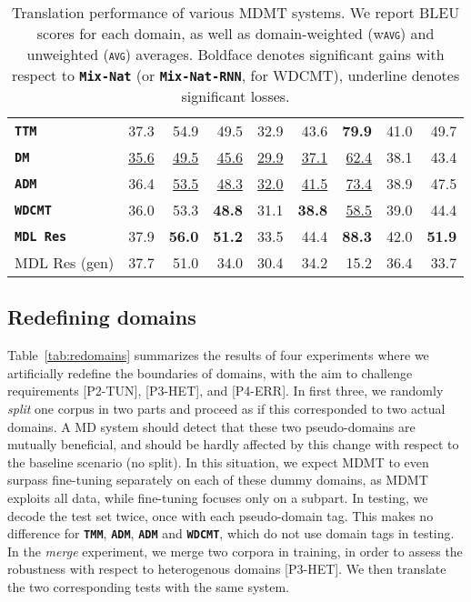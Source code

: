 \documentclass[11pt,a4paper]{article}
\newcommand{\fyTodo}[1]{\Todo[FY:]{\textcolor{orange}{#1}}}
\newcommand{\fyDone}[1]{\done[FY]\Todo[FY:]{\textcolor{orange}{#1}}}
\newcommand{\domain}[1]{\texttt{\textsc{#1}}}
\newcommand{\system}[1]{\texttt{\textbf{#1}}}
\newcommand{\SB}[1]{\textbf{#1}}
\newcommand{\SW}[1]{\underline{#1}}
\begin{document}
\begin{table*}
\begin{tabular}{|p{3cm}|*{8}{r|}}
    \system{TTM}            & 37.3 & 54.9 & 49.5 & 32.9 & 43.6 & \SB{79.9} &41.0 & 49.7     \\%
    \system{DM}             & \SW{35.6} & \SW{49.5}  & \SW{45.6}& \SW{29.9} & \SW{37.1} & \SW{62.4} & 38.1 & 43.4 \\ %
    \system{ADM}           & 36.4 & \SW{53.5}  & \SW{48.3} & \SW{32.0} & \SW{41.5} & \SW{73.4} & 38.9 & 47.5 \\%
    \system{WDCMT}       & 36.0 & 53.3 & \SB{48.8} & 31.1 & \SB{38.8} & \SW{58.5} & 39.0 & 44.4 \\ %
    \system{MDL Res}     & 37.9 & \SB{56.0}  & \SB{51.2}   & 33.5   &  44.4  & \SB{88.3} & 42.0 & \SB{51.9} \\%
    \hfill MDL Res (gen)    & 37.7 & 51.0 & 34.0 & 30.4 & 34.2 & 15.2 & 36.4 & 33.7\\
     \hline
  \end{tabular}
  \caption{Translation performance of various MDMT systems. We report BLEU scores for each domain, as well as domain-weighted (w\domain{avg}) and unweighted (\domain{avg}) averages. Boldface denotes significant gains with respect to \system{Mix-Nat} (or \system{Mix-Nat-RNN}, for WDCMT), underline denotes significant losses.}
  \label{tab:performance}
  \fyTodo{Do we have significancy tests for averages?} %
\end{table*}

\subsection{Redefining domains \label{ssec:redomains}}

Table~\ref{tab:redomains} summarizes the results of four experiments where we artificially redefine the boundaries of domains, with the aim to challenge requirements [P2-TUN], [P3-HET], and [P4-ERR]. In first three, we randomly \emph{split} one corpus in two parts and proceed as if this corresponded to two actual domains. A MD system should detect that these two pseudo-domains are mutually beneficial, and should be hardly affected by this change with respect to the baseline scenario (no split). In this situation, we expect MDMT to even surpass fine-tuning separately on each of these dummy domains, as MDMT exploits all data, while fine-tuning focuses only on a subpart. In testing, we decode the test set twice, once with each pseudo-domain tag. This makes no difference for \system{TMM}, \system{ADM}, \system{ADM} and \system{WDCMT}, which do not use domain tags in testing.
In the \textsl{merge} experiment, we merge two corpora in training, in order to assess the robustness with respect to heterogenous domains [P3-HET]. We then translate the two corresponding tests with the same system.
\end{document}
